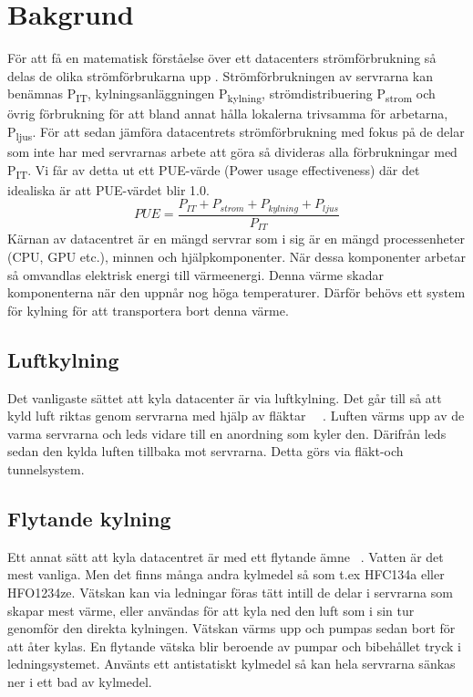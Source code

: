 \documentclass[conference,a4paper]{IEEEtran}
\begin{document}
\section{Bakgrund}
För att få en matematisk förståelse över ett datacenters strömförbrukning så delas de olika strömförbrukarna upp \cite{modelling2}. Strömförbrukningen 
av servrarna kan benämnas P\textsubscript{IT}, kylningsanläggningen P\textsubscript{kylning}, strömdistribuering P\textsubscript{strom} 
och övrig förbrukning för att bland annat hålla lokalerna trivsamma för arbetarna, P\textsubscript{ljus}. För att sedan jämföra datacentrets strömförbrukning med 
fokus på de delar som inte har med servrarnas arbete att göra så divideras alla förbrukningar med P\textsubscript{IT}. Vi får av detta ut ett PUE-värde 
(Power usage effectiveness) där det idealiska är att PUE-värdet blir 1.0.
\begin{equation}
    PUE = \frac{P_{IT} + P_{strom} + P_{kylning} + P_{ljus}}{P_{IT}}    
\end{equation}
Kärnan av datacentret är en mängd servrar som i sig är en mängd processenheter (CPU, GPU etc.), minnen och hjälpkomponenter. 
När dessa komponenter arbetar så omvandlas elektrisk energi till värmeenergi. Denna värme skadar komponenterna när den uppnår nog höga temperaturer. Därför behövs  
ett system för kylning för att transportera bort denna värme.
\subsection{Luftkylning}
Det vanligaste sättet att kyla datacenter är via luftkylning. Det går till så att kyld luft 
riktas genom servrarna med hjälp av fläktar ~\cite{modelling2}~\cite{modelling1}. Luften värms upp av de varma servrarna och leds vidare till en anordning som kyler den. 
Därifrån leds sedan den kylda luften tillbaka mot servrarna. Detta görs via fläkt-och tunnelsystem.
\subsection{Flytande kylning}
Ett annat sätt att kyla datacentret är med ett flytande ämne ~\cite{energycompare2}. Vatten är det mest vanliga. Men det finns många andra kylmedel så 
som t.ex HFC134a eller HFO1234ze. Vätskan kan via ledningar föras tätt intill de delar i servrarna som skapar mest värme, eller användas för att kyla ned den 
luft som i sin tur genomför den direkta kylningen. Vätskan värms upp och pumpas sedan bort för att åter kylas. En flytande vätska 
blir beroende av pumpar och bibehållet tryck i ledningsystemet. Använts ett antistatiskt kylmedel \cite{immersioncooling1} så kan hela servrarna sänkas ner i ett 
bad av kylmedel.  
\end{document}
